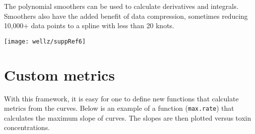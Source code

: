 The polynomial smoothers can be used to calculate derivatives and
integrals. Smoothers also have the added benefit of data compression, sometimes
reducing 10,000+ data points to a spline with less than 20 knots.

\begin{knitrout}
\color{fgcolor}\begin{kframe}
\begin{alltt}
 \hlkwb{=} 
     \hlstd{=} \hlstd{)}
 \hlkwb{=} 
    \hlstd{(}\hlstd{,} \hlstd{,}
        \hlstd{),}  \hlstd{=} \hlstd{,}
     \hlstd{=} \hlstd{(}\hlopt{-}\hlstd{,} \hlstd{))}
 \hlkwb{=} 
     \hlstd{=} \hlstd{,}  \hlstd{=} \hlopt{/}\hlstd{,}
     \hlstd{=} \hlstd{,}  \hlstd{=} \hlopt{/}\hlstd{,}
     \hlstd{=} \hlstd{(}\hlstd{,}
        \hlstd{))}

\hlstd{(huvecs.smth[}\hlstd{(}\hlstd{,} \hlstd{,} \hlstd{,}
    \hlstd{)],}  \hlstd{=} \hlstd{(}\hlopt{-}\hlstd{,} \hlstd{),}  \hlstd{=} \hlstd{,}
     \hlstd{=} \hlstd{)}
\end{alltt}
\end{kframe}
\texttt{[image: wellz/suppRef6]} 
\end{knitrout}

\section{Custom metrics}
With this framework, it is easy for one to define new functions that calculate
metrics from the curves. Below is an example of a function (\texttt{max.rate}) that calculates
the maximum slope of curves. The slopes are then plotted versus toxin concentrations.

